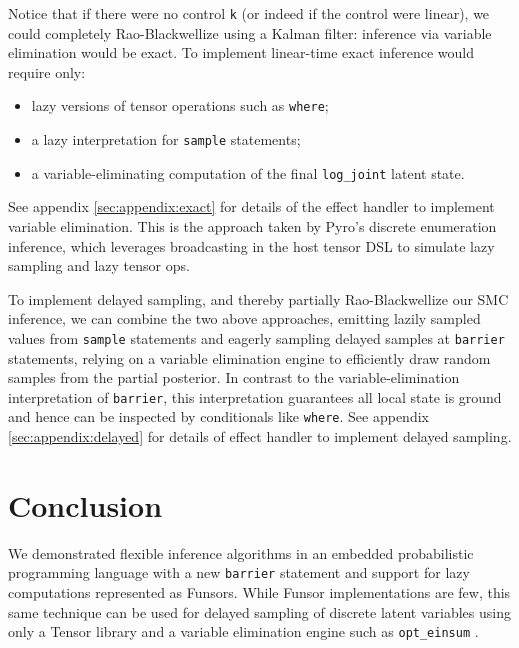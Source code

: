 \documentclass[anonymous=false, %
               format=acmsmall, %
               review=true, %
               screen=true, %
               nonacm=true]{acmart}
\begin{document}
Notice that if there were no control \verb$k$ (or indeed if the control were linear), we could completely Rao-Blackwellize using a Kalman filter: inference via variable elimination would be exact.
To implement linear-time exact inference would require only:
\begin{itemize}
  \item lazy versions of tensor operations such as \verb$where$;
  \item a lazy interpretation for \verb$sample$ statements;
  \item a variable-eliminating computation of the final \verb$log_joint$ latent state.
\end{itemize}
See appendix \ref{sec:appendix:exact} for details of the effect handler to implement variable elimination.
This is the approach taken by Pyro's discrete enumeration inference, which leverages broadcasting in the host tensor DSL to simulate lazy sampling and lazy tensor ops.

To implement delayed sampling, and thereby partially Rao-Blackwellize our SMC inference, we can combine the two above approaches, emitting lazily sampled values from \verb$sample$ statements and eagerly sampling delayed samples at \verb$barrier$ statements, relying on a variable elimination engine to efficiently draw random samples from the partial posterior.
In contrast to the variable-elimination interpretation of \verb$barrier$, this interpretation guarantees all local state is ground and hence can be inspected by conditionals like \verb$where$.
See appendix \ref{sec:appendix:delayed} for details of effect handler to implement delayed sampling.

\section{Conclusion}

We demonstrated flexible inference algorithms in an embedded probabilistic programming language with a new \verb$barrier$ statement and support for lazy computations represented as Funsors.
While Funsor implementations are few, this same technique can be used for delayed sampling of discrete latent variables using only a Tensor library and a variable elimination engine such as \verb$opt_einsum$ \cite{smith2018opt_einsum}.

\end{document}
